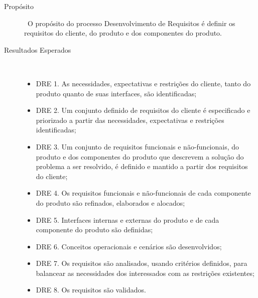     \begin{description}
      \item [Propósito] \
       O propósito do processo Desenvolvimento de Requisitos é definir os requisitos
       do cliente, do produto e dos componentes do produto.
      \item [Resultados Esperados]\
        \begin{itemize}
          \item DRE 1. As necessidades, expectativas e restrições do cliente, tanto do produto
                quanto de suas interfaces, são identificadas;
          \item DRE 2. Um conjunto definido de requisitos do cliente é especificado e priorizado
                a partir das necessidades, expectativas e restrições identificadas;
          \item DRE 3. Um conjunto de requisitos funcionais e não-funcionais, do produto e dos componentes
                      do produto que descrevem a solução do problema a ser resolvido, é definido e mantido
                      a partir dos requisitos do cliente;
          \item DRE 4. Os requisitos funcionais e não-funcionais de cada componente do produto são
                refinados, elaborados e alocados;
          \item DRE 5. Interfaces internas e externas do produto e de cada componente do produto são
                definidas;
          \item DRE 6. Conceitos operacionais e cenários são desenvolvidos;
          \item DRE 7. Os requisitos são analisados, usando critérios definidos, para balancear
                as necessidades dos interessados com as restrições existentes;
          \item DRE 8. Os requisitos são validados.
        \end{itemize}
    \end{description}
